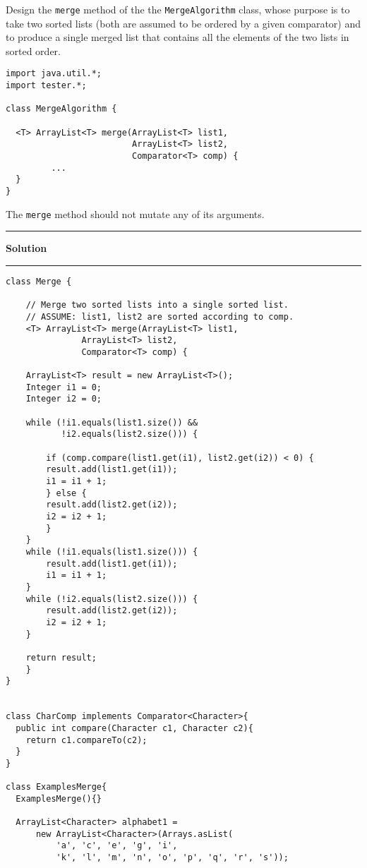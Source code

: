 \documentclass[11pt]{article}
\def\thel{\noindent\rule{2.5cm}{.5pt}}
\def\begsol#1{\thel {\bf Solution} \thel}\def\endsol{\relax}
\def\pts#1{\marginpar{\footnotesize \raggedright  \fbox{#1 {\sc Points}}}}
\newcounter{Pctr}
\newenvironment{problem}{\stepcounter{Pctr}%
\begin{description}
\item[\noindent{\bf Problem} \arabic{Pctr}]
\end{description}}{\relax}
\begin{document}
\vfill\thispagestyle{empty}
\newpage

\pts{10}
\begin{problem}
Design the \texttt{merge} method of the the \texttt{MergeAlgorithm}
class, whose purpose is to take two sorted lists (both are assumed to
be ordered by a given comparator) and to produce a single merged list
that contains all the elements of the two lists in sorted order.

\begin{verbatim}
import java.util.*;
import tester.*;

class MergeAlgorithm {

  <T> ArrayList<T> merge(ArrayList<T> list1,
                         ArrayList<T> list2,
                         Comparator<T> comp) {
         ...
  }
}
\end{verbatim}

\noindent
The \texttt{merge} method should not mutate any of its arguments.

\begsol{\vspace{0.5in}}
\begin{verbatim}
class Merge {

    // Merge two sorted lists into a single sorted list.
    // ASSUME: list1, list2 are sorted according to comp.
    <T> ArrayList<T> merge(ArrayList<T> list1,
			   ArrayList<T> list2,
			   Comparator<T> comp) {

	ArrayList<T> result = new ArrayList<T>();
	Integer i1 = 0;
	Integer i2 = 0;

	while (!i1.equals(list1.size()) &&
	       !i2.equals(list2.size())) {

	    if (comp.compare(list1.get(i1), list2.get(i2)) < 0) {
		result.add(list1.get(i1));
		i1 = i1 + 1;
	    } else {
		result.add(list2.get(i2));
		i2 = i2 + 1;
	    }
	}
	while (!i1.equals(list1.size())) {
	    result.add(list1.get(i1));
	    i1 = i1 + 1;
	}
	while (!i2.equals(list2.size())) {
	    result.add(list2.get(i2));
	    i2 = i2 + 1;
	}

	return result;
    }
}


class CharComp implements Comparator<Character>{
  public int compare(Character c1, Character c2){
    return c1.compareTo(c2);
  }
}

class ExamplesMerge{
  ExamplesMerge(){}
  
  ArrayList<Character> alphabet1 = 
      new ArrayList<Character>(Arrays.asList(
          'a', 'c', 'e', 'g', 'i', 
          'k', 'l', 'm', 'n', 'o', 'p', 'q', 'r', 's'));
  

\end{verbatim}
\end{problem}
\end{document}
